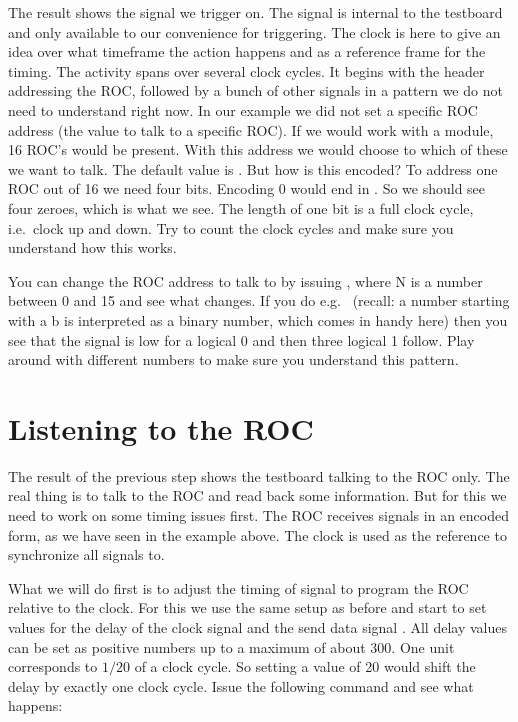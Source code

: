 The result shows the signal we trigger on. The  signal is internal to the testboard and only available to our convenience for triggering. The clock is here to give an idea over what timeframe the action happens and as a reference frame for the timing. The activity spans over several clock cycles. It begins with the header addressing the \gls{ROC}, followed by a bunch of other signals in a pattern we do not need to understand right now. In our example we did not set a specific \gls{ROC} address (the value to talk to a specific \gls{ROC}). If we would work with a module, 16 \gls{ROC}'s would be present. With this address we would choose to which of these we want to talk. The default value is . But how is this encoded? To address one \gls{ROC} out of 16 we need four bits. Encoding 0 would end in . So we should see four zeroes, which is what we see. The length of one bit is a full clock cycle, i.e.~clock up and down. Try to count the clock cycles and make sure you understand how this works.

You can change the \gls{ROC} address to talk to by issuing , where N is a number between 0 and 15 and see what changes. If you do e.g.~ (recall: a number starting with a b is interpreted as a binary number, which comes in handy here) then you see that the signal is low for a logical 0 and then three logical 1 follow. Play around with different numbers to make sure you understand this pattern.

\section{Listening to the ROC}
The result of the previous step shows the testboard talking to the \gls{ROC} only. The real thing is to talk to the \gls{ROC} and read back some information. But for this we need to work on some timing issues first. The \gls{ROC} receives signals in an encoded form, as we have seen in the example above. The clock is used as the reference to synchronize all signals to.

What we will do first is to adjust the timing of signal to program the \gls{ROC} relative to the clock. For this we use the same setup as before and start to set values for the delay of the clock signal  and the send data signal . All delay values can be set as positive numbers up to a maximum of about 300. One unit corresponds to $1/20$ of a clock cycle. So setting a value of 20 would shift the delay by exactly one clock cycle. Issue the following command and see what happens:


